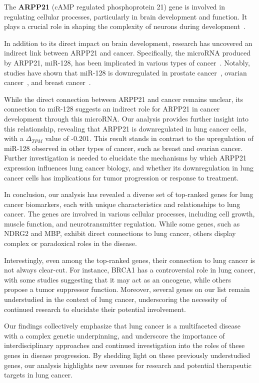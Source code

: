 The \textbf{ARPP21} (cAMP regulated phosphoprotein 21) gene is involved in regulating cellular processes,
particularly in brain development and function.
It plays a crucial role in shaping the complexity of neurons during development~\cite{Rehfeld2018ARPP21}.

In addition to its direct impact on brain development, research has uncovered an indirect link between ARPP21 and cancer.
Specifically, the microRNA produced by ARPP21, miR-128, has been implicated in various types of cancer~\cite{Li2013ARPP21}.
Notably, studies have shown that miR-128 is downregulated in prostate cancer~\cite{Khan2010ARPP21}, ovarian cancer~\cite{Woo2012ARPP21},
and breast cancer~\cite{Zhu2011ARPP21}.

While the direct connection between ARPP21 and cancer remains unclear,
its connection to miR-128 suggests an indirect role for ARPP21 in cancer development through this microRNA.
Our analysis provides further insight into this relationship, revealing that ARPP21 is downregulated in lung cancer cells,
with a $\Delta_{TPM}$ value of -0.201.
This result stands in contrast to the upregulation of miR-128 observed in other types of cancer, such as breast and ovarian cancer.
Further investigation is needed to elucidate the mechanisms by which ARPP21 expression influences lung cancer biology,
and whether its downregulation in lung cancer cells has implications for tumor progression or response to treatment.
\newline


In conclusion, our analysis has revealed a diverse set of top-ranked genes for lung cancer biomarkers,
each with unique characteristics and relationships to lung cancer.
The genes are involved in various cellular processes, including cell growth, muscle function, and neurotransmitter regulation.
While some genes, such as NDRG2 and MBP, exhibit direct connections to lung cancer,
others display complex or paradoxical roles in the disease.

Interestingly, even among the top-ranked genes, their connection to lung cancer is not always clear-cut.
For instance, BRCA1 has a controversial role in lung cancer, with some studies suggesting that it may act as an oncogene,
while others propose a tumor suppressor function.
Moreover, several genes on our list remain understudied in the context of lung cancer,
underscoring the necessity of continued research to elucidate their potential involvement.

Our findings collectively emphasize that lung cancer is a multifaceted disease with a complex genetic underpinning,
and underscore the importance of interdisciplinary approaches and continued investigation into the roles of these genes in disease progression.
By shedding light on these previously understudied genes, our analysis highlights new avenues for research and potential therapeutic targets in lung cancer.